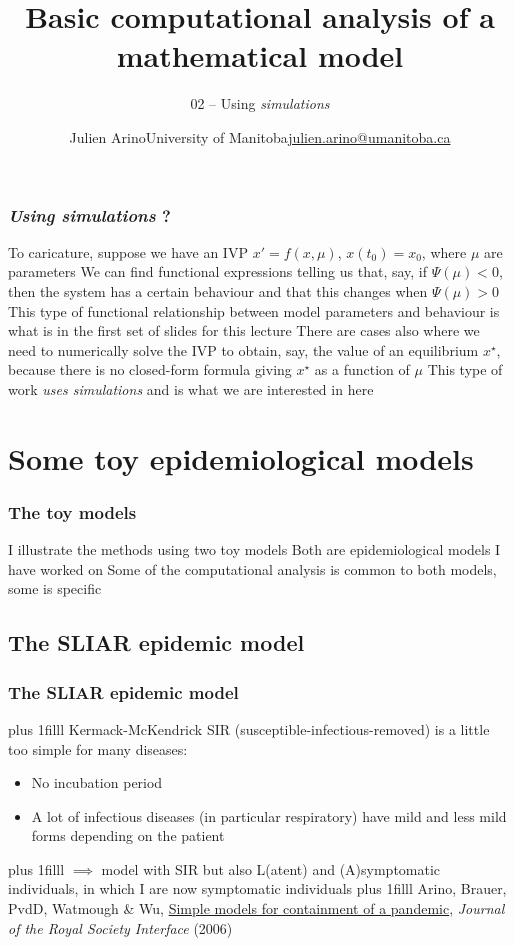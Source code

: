 \documentclass[aspectratio=169]{beamer}\usepackage[]{graphicx}\usepackage[]{xcolor}
\title[Basic computational analysis]{Basic computational analysis of a mathematical model}
\subtitle{02 -- Using \textit{simulations}}
\author{\texorpdfstring{Julien Arino\newline University of Manitoba\newline\url{julien.arino@umanitoba.ca}}{Julien Arino}}
\date{}
\begin{document}

\begin{frame}\frametitle{\emph{Using simulations} ?}
To caricature, suppose we have an IVP $x'=f(x,\mu)$, $x(t_0)=x_0$, where $\mu$ are parameters
\vfill
We can find functional expressions telling us that, say, if $\Psi(\mu)<0$, then the system has a certain behaviour and that this changes when $\Psi(\mu)>0$
\vfill
This type of functional relationship between model parameters and behaviour is what is in the first set of slides for this lecture
\vfill
There are cases also where we need to numerically solve the IVP to obtain, say, the value of an equilibrium $x^\star$, because there is no closed-form formula giving $x^\star$ as a function of $\mu$
\vfill
This type of work \emph{uses simulations} and is what we are interested in here
\end{frame}


\section{Some toy epidemiological models}

\begin{frame}\frametitle{The toy models}
I illustrate the methods using two toy models
\vfill
Both are epidemiological models I have worked on
\vfill
Some of the computational analysis is common to both models, some is specific
\end{frame}

\subsection{The SLIAR epidemic model}

\begin{frame}\frametitle{The SLIAR epidemic model}
\vskip0pt plus 1filll
Kermack-McKendrick SIR (susceptible-infectious-removed) is a little too simple for many diseases:
\begin{itemize}
\item No incubation period
\item A lot of infectious diseases (in particular respiratory) have mild and less mild forms depending on the patient
\end{itemize}
\vskip0pt plus 1filll
$\implies$ model with SIR but also L(atent) and (A)symptomatic individuals, in which I are now symptomatic individuals
\vskip0pt plus 1filll
\tiny
Arino, Brauer, PvdD, Watmough \& Wu, \href{http://dx.doi.org/10.1098/rsif.2006.0112}{Simple models for containment of a pandemic}, \emph{Journal of the Royal Society Interface} (2006)
\end{frame}
\end{document}
